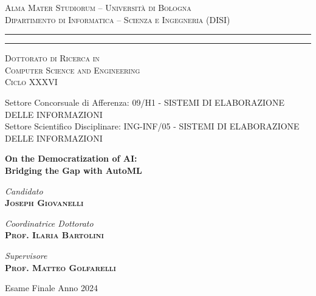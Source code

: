 \begin{titlepage}
%
%
\begin{center}
{{\Large{\textsc{Alma Mater Studiorum -- Università di Bologna}}\\\normalsize{\textsc{Dipartimento di Informatica -- Scienza e Ingegneria (DISI)}}}}
\rule[0.1cm]{15.8cm}{0.1mm}
\rule[0.5cm]{15.8cm}{0.6mm}
{\large{\textsc {Dottorato di Ricerca in\\Computer Science and Engineering}}\\
\vspace{3mm}
\normalsize{\textsc {Ciclo XXXVI}}}
\end{center}
%
\vspace{7mm}
%
%
\begin{footnotesize}
\centering
Settore Concorsuale di Afferenza: 09/H1 - SISTEMI DI ELABORAZIONE DELLE INFORMAZIONI\\
Settore Scientifico Disciplinare: ING-INF/05 - SISTEMI DI ELABORAZIONE DELLE INFORMAZIONI
\end{footnotesize}
%
\vfill
%
%
\begin{center}
{\LARGE\textbf{On the Democratization of AI:}\\\vskip 1pt
\Large\textbf{Bridging the Gap with AutoML}}
\end{center}
%
\vfill
%
%
\begin{center}
{\large{\emph{Candidato}}\\
{\bf \textsc{Joseph Giovanelli}}}
\end{center}
%
\vskip 16pt
%
%
\begin{minipage}[t]{0.47\textwidth}
{\large{\emph{Coordinatrice Dottorato}}\\
{\bf \textsc{Prof. Ilaria Bartolini}}}
\end{minipage}
\hfill
\begin{minipage}[t]{0.47\textwidth}\raggedleft
{\large{\emph{Supervisore}}\\
{\bf \textsc{Prof. Matteo Golfarelli}}}
\end{minipage}
%
\vfill
%
%
\begin{center}
{\large{\sc Esame Finale Anno 2024}}
\end{center}
%
\clearemptydoublepage

\end{titlepage}